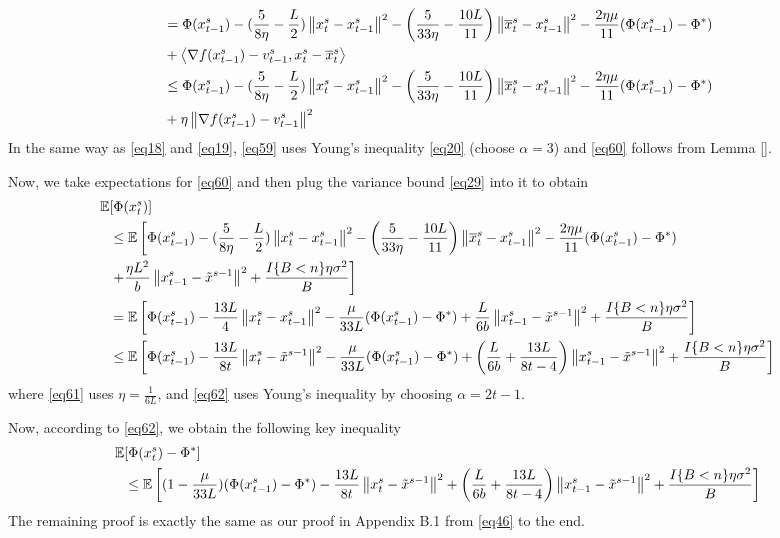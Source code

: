\documentclass{article}
\newcommand*{\E}{\mathbb{E}}
\newcommand{\norm}[1]{\left\lVert#1\right\rVert}
\newcommand{\Iprod}[2]{\left\langle #1,#2\right\rangle}
\theoremstyle{definition}
\theoremstyle{remark}
\begin{document}
\begin{align}
&= \Phi({x}^s_{t-1}) - (\frac{5}{8\eta} - \frac{L}{2})\norm{{x}^s_{t}-{x}^s_{t-1}}^2-\left(\frac{5}{33\eta}-\frac{10L}{11}\right) \norm{\overline{x}^s_t - {x}^s_{t-1}}^2-\frac{2\eta\mu}{11}(\Phi({x}^s_{t-1})-\Phi^*)\notag\\
&+\Iprod{\nabla f({x}^s_{t-1}) - v_{t-1}^s}{{x}^s_t - \overline{x}^s_{t}}\notag\\
&\leq \Phi({x}^s_{t-1}) - (\frac{5}{8\eta} - \frac{L}{2})\norm{{x}^s_{t}-{x}^s_{t-1}}^2-\left(\frac{5}{33\eta}-\frac{10L}{11}\right) \norm{\overline{x}^s_t - {x}^s_{t-1}}^2-\frac{2\eta\mu}{11}(\Phi({x}^s_{t-1})-\Phi^*)\notag\\
&+\eta \norm{\nabla f({x}^s_{t-1}) - v_{t-1}^s}^2\label{eq60}
\end{align}
In the same way as \eqref{eq18} and \eqref{eq19}, \eqref{eq59} uses Young's inequality \eqref{eq20} (choose $\alpha = 3$) and \eqref{eq60} follows from Lemma \ref{}.

Now, we take expectations for \eqref{eq60} and then plug the variance bound \eqref{eq29} into it to obtain
\begin{align}
\E&[\Phi({x}^s_t)]\notag\\ 
&\leq \E\left[\Phi({x}^s_{t-1}) - (\frac{5}{8\eta} - \frac{L}{2})\norm{{x}^s_{t}-{x}^s_{t-1}}^2-\left(\frac{5}{33\eta}-\frac{10L}{11}\right) \norm{\overline{x}^s_t - {x}^s_{t-1}}^2-\frac{2\eta\mu}{11}(\Phi({x}^s_{t-1})-\Phi^*)\notag\right.\\
&\left.+\frac{\eta L^2}{b}\norm{{x}^s_{t-1}-\tilde{x}^{s-1}}^2+\frac{I\{B < n\}\eta \sigma ^2}{B}\right]\notag\\ 
&= \E\left[\Phi({x}^s_{t-1}) - \frac{13 L}{4}\norm{{x}^s_{t}-{x}^s_{t-1}}^2-\frac{\mu}{33L}(\Phi({x}^s_{t-1})-\Phi^*)+\frac{L}{6b}\norm{{x}^s_{t-1}-\tilde{x}^{s-1}}^2+\frac{I\{B < n\}\eta \sigma ^2}{B}\right]\label{eq61}\\
&\leq \E\left[\Phi({x}^s_{t-1}) - \frac{13 L}{8t}\norm{{x}^s_{t}-\tilde{x}^{s-1}}^2-\frac{\mu}{33L}(\Phi({x}^s_{t-1})-\Phi^*)+\left(\frac{L}{6b}+\frac{13L}{8t-4}\right)\norm{{x}^s_{t-1}-\tilde{x}^{s-1}}^2+\frac{I\{B < n\}\eta \sigma ^2}{B}\right]\label{eq62}
\end{align}
where \eqref{eq61} uses $\eta = \frac{1}{6L}$, and \eqref{eq62} uses Young's inequality by choosing $\alpha = 2t-1$.

Now, according to \eqref{eq62}, we obtain the following key inequality 
\begin{align}
\E&[\Phi({x}^s_t)-\Phi^*]\\ 
&\leq \E\left[(1-\frac{\mu}{33L})(\Phi({x}^s_{t-1})-\Phi^*) - \frac{13 L}{8t}\norm{{x}^s_{t}-\tilde{x}^{s-1}}^2+\left(\frac{L}{6b}+\frac{13L}{8t-4}\right)\norm{{x}^s_{t-1}-\tilde{x}^{s-1}}^2+\frac{I\{B < n\}\eta \sigma ^2}{B}\right]\notag\\
\end{align}
The remaining proof is exactly the same as our proof in Appendix B.1 from \eqref{eq46} to the end.
\end{document}
